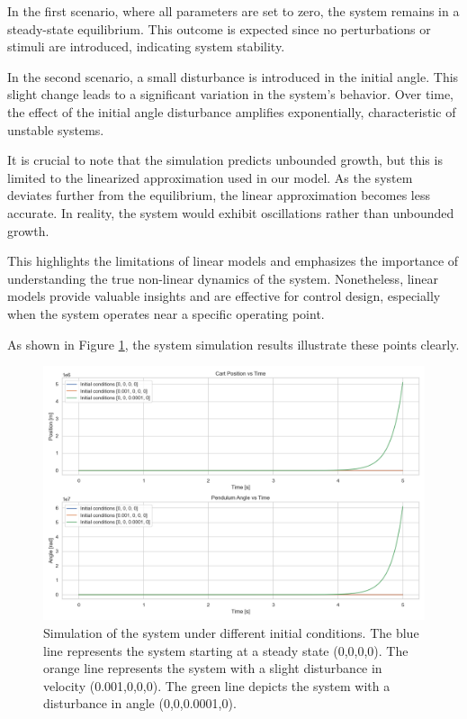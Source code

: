 \documentclass[11pt,twocolumn,twoside,lineno]{pnas-new}
\begin{document}
In the first scenario, where all parameters are set to zero, the system remains in a steady-state equilibrium. This outcome is expected since no perturbations or stimuli are introduced, indicating system stability.

In the second scenario, a small disturbance is introduced in the initial angle. This slight change leads to a significant variation in the system's behavior. Over time, the effect of the initial angle disturbance amplifies exponentially, characteristic of unstable systems.

It is crucial to note that the simulation predicts unbounded growth, but this is limited to the linearized approximation used in our model. As the system deviates further from the equilibrium, the linear approximation becomes less accurate. In reality, the system would exhibit oscillations rather than unbounded growth.

This highlights the limitations of linear models and emphasizes the importance of understanding the true non-linear dynamics of the system. Nonetheless, linear models provide valuable insights and are effective for control design, especially when the system operates near a specific operating point.

As shown in Figure \ref{fig:system_sim}, the system simulation results illustrate these points clearly.

\begin{figure}[h]
\centering
\includegraphics[width=\linewidth]{simulations/system_simulation.png}
\caption{Simulation of the system under different initial conditions. The blue line represents the system starting at a steady state (0,0,0,0). The orange line represents the system with a slight disturbance in velocity (0.001,0,0,0). The green line depicts the system with a disturbance in angle (0,0,0.0001,0).}
\label{fig:system_sim}
\end{figure}
\end{document}
